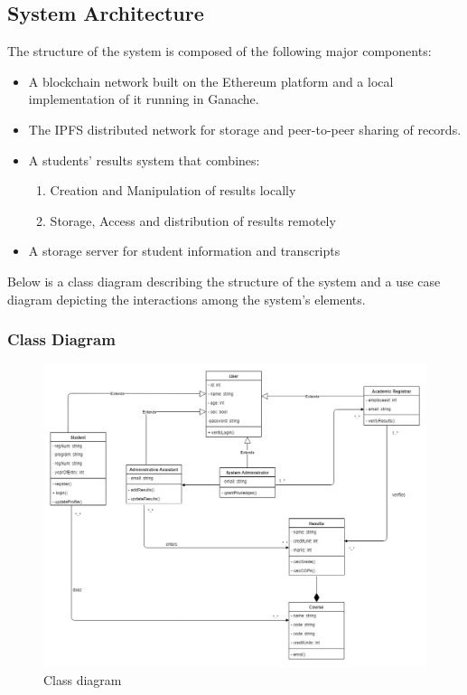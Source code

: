 \subsection{System Architecture}
The structure of the system is composed of the following major components:
\begin{itemize}
\item A blockchain network built on the Ethereum platform and a local implementation of it running in Ganache.
\item The IPFS distributed network for storage and peer-to-peer sharing of records.
\item A students' results system that combines:
\begin{enumerate}
\item Creation and Manipulation of results locally
\item Storage, Access and distribution of results remotely
\end{enumerate}
\item A storage server for student information and transcripts
\end{itemize}
Below is a class diagram describing the structure of the system and a use case diagram depicting the interactions among the system's elements.

\subsubsection{Class Diagram}
\begin{figure}[H]
\includegraphics[scale=0.4]{images/class.jpg}
\caption{Class diagram}
\end{figure}

